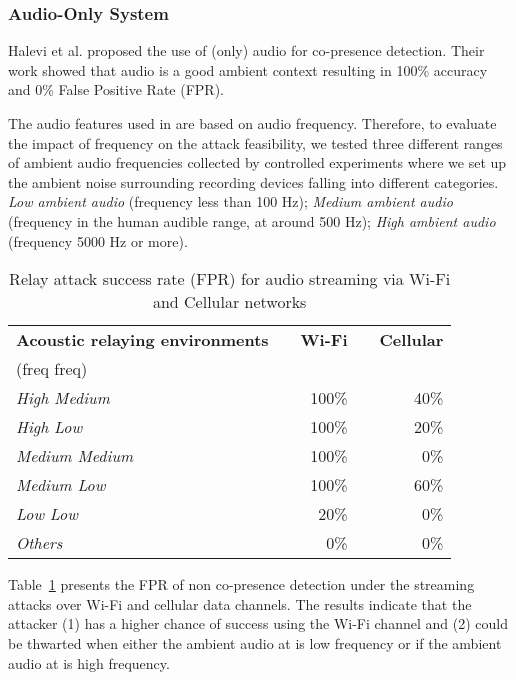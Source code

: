 \subsubsection{Audio-Only System}
\label{sec:audio-only}
Halevi et al. \cite{DBLP:conf/esorics/HaleviMSX12} proposed the use of (only) audio
for co-presence detection. Their work showed that audio is a good ambient
context resulting in 100\% accuracy and 0\% False Positive Rate (FPR).

The audio features used in \cite{DBLP:conf/esorics/HaleviMSX12} are based on
audio frequency. Therefore, to evaluate the impact of frequency on the attack
feasibility, we tested three different ranges of ambient audio frequencies
collected by controlled experiments where we set up the ambient noise
surrounding recording devices falling into different categories. \textit{Low
ambient audio} (frequency less than 100 Hz); \textit{Medium ambient audio}
(frequency in the human audible range, at around 500 Hz); \textit{High ambient
audio} (frequency 5000 Hz or more).


\begin{table}[htbp]
\centering
	\scriptsize
    \caption{Relay attack success rate (FPR) for audio streaming via Wi-Fi and
    Cellular networks} 
    \label{tbl:audio-streaming}

    \begin{tabular}{@{}lcrcr@{}}
        \toprule
        {\bf Acoustic relaying environments} &\phantom{} & {\bf Wi-Fi} &\phantom{} & {\bf Cellular} \\
	(\prover  freq  \verifier  freq) &\phantom{} & {} &\phantom{} & {} \\
        \midrule
        {\em High  Medium} && 100\% && 40\% \\
        {\em High  Low} && 100\% && 20\% \\
        {\em Medium  Medium} && 100\% && 0\% \\
        {\em Medium  Low} && 100\% && 60\% \\
        {\em Low  Low} && 20\% && 0\% \\
        {\em Others}                && 0\%  && 0\% \\ 
        \bottomrule
    \end{tabular}
\end{table}



 Table~\ref{tbl:audio-streaming} presents the FPR of non co-presence detection
under the streaming attacks over Wi-Fi and cellular data channels. The results
indicate that the attacker (1) has a higher chance of success using the Wi-Fi
channel and (2) could be thwarted when either the ambient audio at \prover is low
frequency or if the ambient audio at \verifier is high frequency.







